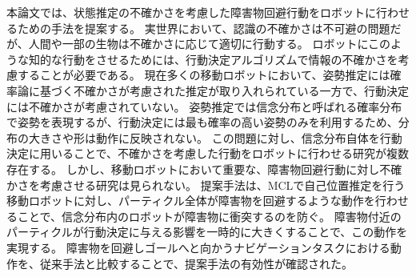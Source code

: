 \begin{jabstract}
本論文では、状態推定の不確かさを考慮した障害物回避行動をロボットに行わせるための手法を提案する。
実世界において、認識の不確かさは不可避の問題だが、人間や一部の生物は不確かさに応じて適切に行動する。
ロボットにこのような知的な行動をさせるためには、行動決定アルゴリズムで情報の不確かさを考慮することが必要である。
現在多くの移動ロボットにおいて、姿勢推定には確率論に基づく不確かさが考慮された推定が取り入れられている一方で、行動決定には不確かさが考慮されていない。
姿勢推定では信念分布と呼ばれる確率分布で姿勢を表現するが、行動決定には最も確率の高い姿勢のみを利用するため、分布の大きさや形は動作に反映されない。
この問題に対し、信念分布自体を行動決定に用いることで、不確かさを考慮した行動をロボットに行わせる研究が複数存在する。
しかし、移動ロボットにおいて重要な、障害物回避行動に対し不確かさを考慮させる研究は見られない。
提案手法は、MCLで自己位置推定を行う移動ロボットに対し、パーティクル全体が障害物を回避するような動作を行わせることで、信念分布内のロボットが障害物に衝突するのを防ぐ。
障害物付近のパーティクルが行動決定に与える影響を一時的に大きくすることで、この動作を実現する。
障害物を回避しゴールへと向かうナビゲーションタスクにおける動作を、従来手法と比較することで、提案手法の有効性が確認された。
\end{jabstract}

